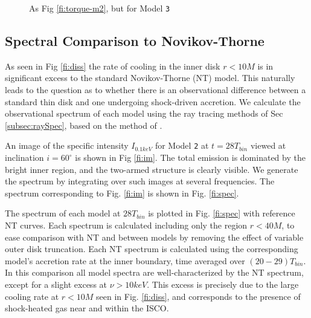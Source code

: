 \documentclass{emulateapj}
\newcommand{\model}[1]{{Model \texttt{#1}}}
\begin{document}
\begin{figure}
	\caption{\label{fi:torque-m4} As Fig \ref{fi:torque-m2}, but for \model{3}}  
\end{figure}

\subsection{Spectral Comparison to Novikov-Thorne}
\label{subsec:spectra}

As seen in Fig \ref{fi:diss} the rate of cooling in the inner disk $r < 10M$ is in significant excess to the standard Novikov-Thorne (NT) model.  This naturally leads to the question as to whether there is an observational difference between a standard thin disk and one undergoing shock-driven accretion.  We calculate the observational spectrum of each model using the ray tracing methods of Sec \ref{subsec:raySpec}, based on the method of \cite{Kulkarni11}.

\begin{figure*}
	\caption{\label{fi:im} Ray-traced image of \model{2} at $\nu =   1keV$.}
\end{figure*}

An image of the specific intensity $I_{0.1keV}$ for \model{2} at $t=28 T_{bin}$ viewed at inclination $i=60^\circ$ is shown in Fig \ref{fi:im}.  The total emission is dominated by the bright inner region, and the two-armed structure is clearly visible. We generate the spectrum by integrating over such images at several frequencies.  The spectrum corresponding to Fig. \ref{fi:im} is shown in Fig. \ref{fi:spec}. 

The spectrum of each model at $28 T_{bin}$ is plotted in Fig. \ref{fi:spec} with reference NT curves.  Each spectrum is calculated including only the region $r<40M$, to ease comparison with NT and between models by removing the effect of variable outer disk truncation.  Each NT spectrum is calculated using the corresponding model's accretion rate at the inner boundary, time averaged over $(20-29)T_{bin}$.  In this comparison all model spectra are well-characterized by the NT spectrum, except for a slight excess at $\nu > 10keV$.  This excess is precisely due to the large cooling rate at $r<10M$ seen in Fig. \ref{fi:diss}, and corresponds to the presence of shock-heated gas near and within the ISCO.  


\begin{figure*}
	\caption{\label{fi:spec} Spectra of \model{1} (blue circles), \model{2} (orange crosses), and \model{3} (green triangles) at $t = 28 T_{bin}$, obtained by integrating over the ray-traced intensity (e.g. in Fig \ref{fi:im}).  Solid lines are Novikov-Thorne spectra with $\dot{M}$ of the inner boundary averaged over $20 T_{bin}$ to $29 T_{bin}$ for each model.  Only the $R<40M$ region is included in the integration, to remove the effect of truncation at the outer disk edge.  The inclination angle $i=60^\circ$ and the distance $D=1kpc$.}
\end{figure*}
\end{document}
